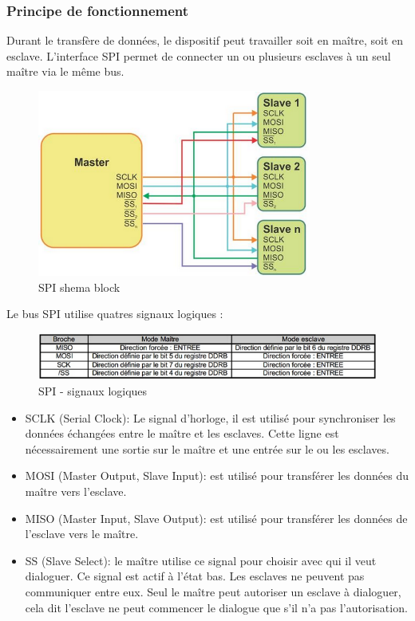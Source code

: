 \documentclass[french,a4paper,12pt]{report}
\begin{document}
			\subsubsection{Principe de fonctionnement}
			
			Durant le transfère de données, le dispositif peut travailler soit en maître, soit en esclave. L'interface SPI permet de connecter un ou plusieurs esclaves à un seul maître via le même bus.
			
	\begin{figure}[!ht]
    \center
  	\includegraphics[width=9cm]{SPI1.png}
    \caption{SPI shema block}
	\end{figure}	
 
 
	Le bus SPI utilise quatres signaux logiques :
 
	\begin{figure}[!ht]
    \center
  	\includegraphics[width=14cm]{SPI2.png}
    \caption{SPI - signaux logiques}
	\end{figure}	
 
	\begin{itemize}
	\item SCLK (Serial Clock): Le signal d'horloge, il est utilisé pour synchroniser les données échangées entre le maître et 	les esclaves. Cette ligne est nécessairement une sortie sur le maître et une entrée sur le ou les esclaves.
 
	\item MOSI (Master Output, Slave Input): est utilisé pour transférer les données du maître vers l'esclave.
 
	\item MISO (Master Input, Slave Output): est utilisé pour transférer les données de l'esclave vers le maître.
 
	\item SS (Slave Select): le maître utilise ce signal pour choisir avec qui il veut dialoguer. Ce signal est actif à l'état bas. Les esclaves ne peuvent pas communiquer entre eux. Seul le maître peut autoriser un esclave à dialoguer, cela dit l'esclave ne peut commencer le dialogue que s'il n'a pas l'autorisation.
\end{itemize}
 
\end{document}
